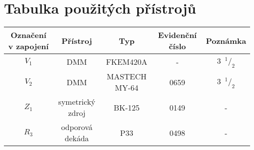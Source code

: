 \section{Tabulka použitých přístrojů}
\begin{tabular}[htbp]{|c|c|c|c|c|}
    \hline
    \textbf{Označení v zapojení} & \textbf{Přístroj} & \textbf{Typ} & \textbf{Evidenční číslo} &\textbf{Poznámka} \\
    \hline
    $V_1$ & DMM & FKEM420A & - & 3~$^1/_2$ \\
    $V_2$ & DMM & MASTECH MY-64 & 0659 & 3~$^1/_2$ \\
    $Z_1$ & symetrický zdroj & BK-125 & 0149 & - \\
    $R_3$ & odporová dekáda & P33 & 0498 & - \\
    \hline
    
  \end{tabular}
